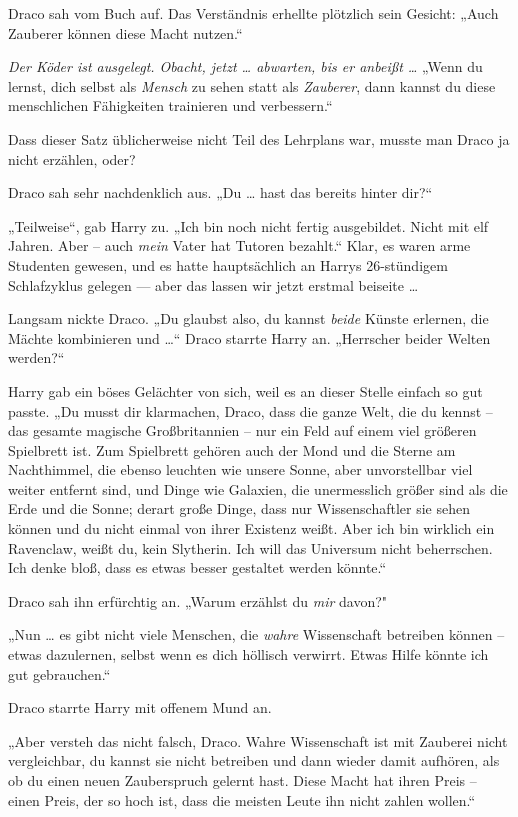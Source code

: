 {Draco sah vom Buch auf. Das Verständnis erhellte plötzlich sein Gesicht: „Auch Zauberer können diese Macht nutzen.“

\emph{Der Köder ist ausgelegt. Obacht, jetzt … abwarten, bis er anbeißt …} „Wenn du lernst, dich selbst als \emph{Mensch} zu sehen statt als \emph{Zauberer}, dann kannst du diese menschlichen Fähigkeiten trainieren und verbessern.“

Dass dieser Satz üblicherweise nicht Teil des Lehrplans war, musste man Draco ja nicht erzählen, oder?

Draco sah sehr nachdenklich aus. „Du … hast das bereits hinter dir?“

„Teilweise“, gab Harry zu. „Ich bin noch nicht fertig ausgebildet. Nicht mit elf Jahren. Aber -- auch \emph{mein} Vater hat Tutoren bezahlt.“ Klar, es waren arme Studenten gewesen, und es hatte hauptsächlich an Harrys 26-stündigem Schlafzyklus gelegen --- aber das lassen wir jetzt erstmal beiseite …

Langsam nickte Draco. „Du glaubst also, du kannst \emph{beide} Künste erlernen, die Mächte kombinieren und …“ Draco starrte Harry an. „Herrscher beider Welten werden?“

Harry gab ein böses Gelächter von sich, weil es an dieser Stelle einfach so gut passte. „Du musst dir klarmachen, Draco, dass die ganze Welt, die du kennst -- das gesamte magische Großbritannien -- nur ein Feld auf einem viel größeren Spielbrett ist. Zum Spielbrett gehören auch der Mond und die Sterne am Nachthimmel, die ebenso leuchten wie unsere Sonne, aber unvorstellbar viel weiter entfernt sind, und Dinge wie Galaxien, die unermesslich größer sind als die Erde und die Sonne; derart große Dinge, dass nur Wissenschaftler sie sehen können und du nicht einmal von ihrer Existenz weißt. Aber ich bin wirklich ein Ravenclaw, weißt du, kein Slytherin. Ich will das Universum nicht beherrschen. Ich denke bloß, dass es etwas besser gestaltet werden könnte.“

Draco sah ihn erfürchtig an. „Warum erzählst du \emph{mir} davon?"

„Nun … es gibt nicht viele Menschen, die \emph{wahre} Wissenschaft betreiben können -- etwas dazulernen, selbst wenn es dich höllisch verwirrt. Etwas Hilfe könnte ich gut gebrauchen.“

Draco starrte Harry mit offenem Mund an.

„Aber versteh das nicht falsch, Draco. Wahre Wissenschaft ist mit Zauberei nicht vergleichbar, du kannst sie nicht betreiben und dann wieder damit aufhören, als ob du einen neuen Zauberspruch gelernt hast. Diese Macht hat ihren Preis -- einen Preis, der so hoch ist, dass die meisten Leute ihn nicht zahlen wollen.“

}
